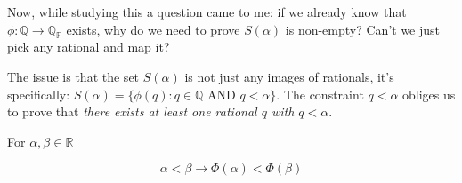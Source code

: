 Now, while studying this a question came to me: if we already know that $\phi: \mathbb{Q} \rightarrow \mathbb{Q_F}$ exists, why do we need to prove $S(\alpha)$ is non-empty? Can't we just pick any rational and map it?


The issue is that the set $S(\alpha)$ is not just any images of rationals, it's specifically:
$S(\alpha) = \{\phi(q) : q \in \mathbb{Q} \text{ AND } q < \alpha\}$. The constraint $q < \alpha$ obliges us to prove that \textit{there exists at least one rational $q$ with $q < \alpha$}.

\begin{lemma}\label{le:order-Phi}
For $\alpha, \beta \in \mathbb{R}$

$$\alpha < \beta \rightarrow \Phi(\alpha) < \Phi(\beta)$$
\end{lemma}

